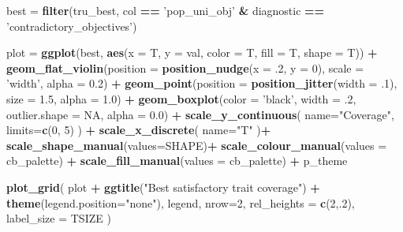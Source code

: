 \documentclass[]{book}
\newenvironment{Shaded}{\begin{snugshade}}{\end{snugshade}}
\newcommand{\DataTypeTok}[1]{\textcolor[rgb]{0.13,0.29,0.53}{#1}}
\newcommand{\DecValTok}[1]{\textcolor[rgb]{0.00,0.00,0.81}{#1}}
\newcommand{\FloatTok}[1]{\textcolor[rgb]{0.00,0.00,0.81}{#1}}
\newcommand{\KeywordTok}[1]{\textcolor[rgb]{0.13,0.29,0.53}{\textbf{#1}}}
\newcommand{\NormalTok}[1]{#1}
\newcommand{\OperatorTok}[1]{\textcolor[rgb]{0.81,0.36,0.00}{\textbf{#1}}}
\newcommand{\OtherTok}[1]{\textcolor[rgb]{0.56,0.35,0.01}{#1}}
\newcommand{\StringTok}[1]{\textcolor[rgb]{0.31,0.60,0.02}{#1}}
\begin{document}
\begin{Shaded}
\begin{Highlighting}[]
\NormalTok{best =}\StringTok{ }\KeywordTok{filter}\NormalTok{(tru_best, col }\OperatorTok{==}\StringTok{ 'pop_uni_obj'} \OperatorTok{&}\StringTok{ }\NormalTok{diagnostic }\OperatorTok{==}\StringTok{ 'contradictory_objectives'}\NormalTok{)}

\NormalTok{plot =}\StringTok{ }\KeywordTok{ggplot}\NormalTok{(best, }\KeywordTok{aes}\NormalTok{(}\DataTypeTok{x =}\NormalTok{ T, }\DataTypeTok{y =}\NormalTok{ val, }\DataTypeTok{color =}\NormalTok{ T, }\DataTypeTok{fill =}\NormalTok{ T, }\DataTypeTok{shape =}\NormalTok{ T)) }\OperatorTok{+}
\StringTok{  }\KeywordTok{geom_flat_violin}\NormalTok{(}\DataTypeTok{position =} \KeywordTok{position_nudge}\NormalTok{(}\DataTypeTok{x =} \FloatTok{.2}\NormalTok{, }\DataTypeTok{y =} \DecValTok{0}\NormalTok{), }\DataTypeTok{scale =} \StringTok{'width'}\NormalTok{, }\DataTypeTok{alpha =} \FloatTok{0.2}\NormalTok{) }\OperatorTok{+}
\StringTok{  }\KeywordTok{geom_point}\NormalTok{(}\DataTypeTok{position =} \KeywordTok{position_jitter}\NormalTok{(}\DataTypeTok{width =} \FloatTok{.1}\NormalTok{), }\DataTypeTok{size =} \FloatTok{1.5}\NormalTok{, }\DataTypeTok{alpha =} \FloatTok{1.0}\NormalTok{) }\OperatorTok{+}
\StringTok{  }\KeywordTok{geom_boxplot}\NormalTok{(}\DataTypeTok{color =} \StringTok{'black'}\NormalTok{, }\DataTypeTok{width =} \FloatTok{.2}\NormalTok{, }\DataTypeTok{outlier.shape =} \OtherTok{NA}\NormalTok{, }\DataTypeTok{alpha =} \FloatTok{0.0}\NormalTok{) }\OperatorTok{+}
\StringTok{  }\KeywordTok{scale_y_continuous}\NormalTok{(}
    \DataTypeTok{name=}\StringTok{"Coverage"}\NormalTok{,}
    \DataTypeTok{limits=}\KeywordTok{c}\NormalTok{(}\DecValTok{0}\NormalTok{, }\DecValTok{5}\NormalTok{)}
\NormalTok{  ) }\OperatorTok{+}
\StringTok{  }\KeywordTok{scale_x_discrete}\NormalTok{(}
    \DataTypeTok{name=}\StringTok{"T"}
\NormalTok{  )}\OperatorTok{+}
\StringTok{  }\KeywordTok{scale_shape_manual}\NormalTok{(}\DataTypeTok{values=}\NormalTok{SHAPE)}\OperatorTok{+}
\StringTok{  }\KeywordTok{scale_colour_manual}\NormalTok{(}\DataTypeTok{values =}\NormalTok{ cb_palette) }\OperatorTok{+}
\StringTok{  }\KeywordTok{scale_fill_manual}\NormalTok{(}\DataTypeTok{values =}\NormalTok{ cb_palette) }\OperatorTok{+}
\StringTok{  }\NormalTok{p_theme}

\KeywordTok{plot_grid}\NormalTok{(}
\NormalTok{  plot }\OperatorTok{+}
\StringTok{    }\KeywordTok{ggtitle}\NormalTok{(}\StringTok{"Best satisfactory trait coverage"}\NormalTok{) }\OperatorTok{+}
\StringTok{    }\KeywordTok{theme}\NormalTok{(}\DataTypeTok{legend.position=}\StringTok{"none"}\NormalTok{),}
\NormalTok{  legend,}
  \DataTypeTok{nrow=}\DecValTok{2}\NormalTok{,}
  \DataTypeTok{rel_heights =} \KeywordTok{c}\NormalTok{(}\DecValTok{2}\NormalTok{,.}\DecValTok{2}\NormalTok{),}
  \DataTypeTok{label_size =}\NormalTok{ TSIZE}
\NormalTok{)}
\end{Highlighting}
\end{Shaded}
\end{document}
